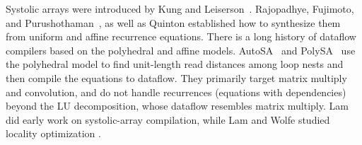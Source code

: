 \documentclass[sigplan, nonacm]{acmart}
\begin{document}
Systolic arrays were introduced by Kung and Leiserson~\citep{kung1979systolic,kung1982why}. Rajopadhye, Fujimoto, and Purushothaman~\citep{rajopadhye1990synthesizing, sanjay-fst-tcs, sanjay-thesis}, as well as Quinton \citep{Quinton84c, quinton1989mapping} established how to synthesize them from uniform and affine recurrence equations. %
There is a long history of dataflow compilers based on the polyhedral and affine models. AutoSA~\citep{autosa} and PolySA~\citep{cong2018polysa} use the polyhedral model to find unit-length read distances among loop nests and then compile the equations to dataflow. They primarily target matrix multiply and convolution, and do not handle recurrences (equations with dependencies) beyond the LU decomposition, whose dataflow resembles matrix multiply. 
Lam did early work on systolic-array compilation, while Lam and Wolfe studied locality optimization \citep{lam1987systolic, lam2004data}.
\end{document}
